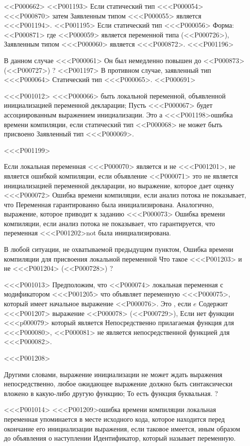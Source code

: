 {{{{{{{{{<<P000662>
<<P001193>
Если статический тип <<<P000054> <<<P000870> затем
Заявленным типом <<<P000055> является <<<P001194>.
<<P001195>
Если статический тип <<<P000056> Форма: <<P000871>
где <<P000059> является переменной типа
(<<P000726>),
Заявленным типом <<<P000060> является <<<P000872>.
<<<P001196>{%
В данном случае <<<P000061> Он был немедленно повышен до <<P000873>
(<<P000727>)%
?
<<P001197>
В противном случае, заявленный тип <<<P000064> Статический тип <<<P000065>.
<<P000691>

<<<P001012>%
<<<P000066> быть локальной переменной, объявленной инициализацией переменной декларации;
Пусть <<<P000067> будет ассоциированным выражением инициализации.
Это а
<<<P001198>{ошибка времени компиляции}, если статический тип <<P000068> не может быть присвоено
Заявленный тип <<<P000069>.

<<<P001199>{%
Если локальная переменная <<<P000070> является \FINAL{} и не <<<P001201>,
не является ошибкой компиляции, если объявление <<P000071> это
не является инициализацией переменной декларации,
но выражение, которое дает оценку <<<P000072>
Ошибка времени компиляции, если анализ потока не показывает, что
Переменная гарантированно была инициализирована.
Аналогично, выражение, которое приводит к заданию <<<P000073>
Ошибка времени компиляции, если анализ потока не показывает, что
гарантируется, что переменная <<<P001202>{not} была инициализирована.%

В любой ситуации, не охватываемой предыдущим пунктом,
Ошибка времени компиляции для присвоения локальной переменной
Что такое <<<P001203> и не <<<P001204>
(<<P000728>) %
?

<<<P001013>%
Предположим, что <<P000074> локальная переменная с модификатором <<<P001205>{}
что объявляет переменную <<<P000075>,
который имеет начальное выражение <<P000076>.
Это , если $e$ Содержит <<<P001207>{} выражение <<P000078>
(<<P000729>),
Если нет функции <<<p000079> который является
Непосредственно прилагаемая функция для <<<P000080>,
<<P000081> не является непосредственной функцией для <<<P000082>.

<<<P001208>{%
Другими словами,
выражение инициализации не может ждать выражения непосредственно,
любое ожидающее выражение должно быть синтаксически вложено в какую-либо другую функцию;
То есть функция буквальная.%
?

<<<P001014>%
<<<P001209>{ошибка времени компиляции}
локальная переменная упоминается в месте исходного кода, которое находится перед
окончание его инициализации выражения, если таковое имеется,
иным образом до объявления о наступлении
Идентификатор, который называет переменную.

}}}}}}}}}}}}
